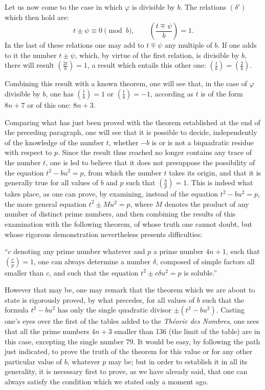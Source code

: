 \documentclass[11pt]{article}
\newcommand{\leg}[2]{\left(\frac{#1}{#2}\right)}
\newcommand{\unitid}[1]{\hypertarget{#1}{}}
\begin{document}
\unitid{dirichlet.v1.p04b.en.par.010}Let us now come to the case in which $\varphi$ is divisible by $b$. The relations $(\delta')$ which then hold are:
\unitid{dirichlet.v1.p04b.en.eq.013}
\[
t\pm\psi\equiv0\pmod b,\qquad
\leg{t\mp\psi}{b}=1.
\]
In the last of these relations one may add to $t\mp\psi$ any multiple of $b$. If one adds to it the number $t\pm\psi$, which, by virtue of the first relation, is divisible by $b$, there will result $\leg{2t}{b}=1$, a result which entails this other one: $\leg{t}{b}=\leg{2}{b}$.

\unitid{dirichlet.v1.p04b.en.par.011}Combining this result with a known theorem, one will see that, in the case of $\varphi$ divisible by $b$, one has $\leg{t}{b}=1$ or $\leg{t}{b}=-1$, according as $t$ is of the form $8n+7$ or of this one: $8n+3$.

\unitid{dirichlet.v1.p04b.en.par.012}Comparing what has just been proved with the theorem established at the end of the preceding paragraph, one will see that it is possible to decide, independently of the knowledge of the number $t$, whether $-b$ is or is not a biquadratic residue with respect to $p$. Since the result thus reached no longer contains any trace of the number $t$, one is led to believe that it does not presuppose the possibility of the equation $t^2-bu^2=p$, from which the number $t$ takes its origin, and that it is generally true for all values of $b$ and $p$ such that $\leg{b}{p}=1$. This is indeed what takes place, as one can prove, by examining, instead of the equation $t^2-bu^2=p$, the more general equation $t^2\pm Mu^2=p$, where $M$ denotes the product of any number of distinct prime numbers, and then combining the results of this examination with the following theorem, of whose truth one cannot doubt, but whose rigorous demonstration nevertheless presents difficulties:

\unitid{dirichlet.v1.p04b.en.par.013}“$c$ denoting any prime number whatever and $p$ a prime number $4n+1$, such that $\leg{c}{p}=1$, one can always determine a number $\delta$, composed of simple factors all smaller than $c$, and such that the equation $t^2\pm c\delta u^2=p$ is soluble.”

\unitid{dirichlet.v1.p04b.en.par.014}However that may be, one may remark that the theorem which we are about to state is rigorously proved, by what precedes, for all values of $b$ such that the formula $t^2-bu^2$ has only the single quadratic divisor $\pm(t^2-bu^2)$. Casting one's eyes over the first of the tables added to the \emph{Théorie des Nombres}, one sees that all the prime numbers $4n+3$ smaller than 136 (the limit of the table) are in this case, excepting the single number 79. It would be easy, by following the path just indicated, to prove the truth of the theorem for this value or for any other particular value of $b$, whatever $p$ may be; but in order to establish it in all its generality, it is necessary first to prove, as we have already said, that one can always satisfy the condition which we stated only a moment ago.
\end{document}
